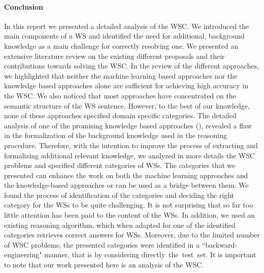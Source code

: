 
\paragraph{Conclusion}
In this report we presented a detailed analysis of the WSC. We introduced the main components of a WS and identified the need for  additional, background knowledge as a main challenge for correctly resolving one. We presented an extensive literature review on the existing different proposals and their contributions towards solving the WSC. In the review of the different approaches, we highlighted that neither the machine learning based approaches nor the knowledge based approaches alone are sufficient for achieving high accuracy in the WSC. We also noticed that most approaches have concentrated on the semantic structure of the WS sentence. However, to the best of our knowledge, none of these approaches specified domain specific categories. The detailed analysis of one of the promising knowledge based approaches (\cite{2018CommonsenseKT}), revealed a flaw in the formalization of the background knowledge used in the reasoning procedure. Therefore, with the intention to improve the process of extracting and formalizing additional relevant knowledge, we analyzed in more details the WSC problems and specified different categories of WSs. The categories that we presented can enhance the work on both the machine learning approaches and the knowledge-based approaches or can be used as a bridge between them. We found the process of identification of the categories and deciding the right category for the WSs to be quite challenging. It is not surprising that so far too little attention has been paid to the content of the WSs. In addition, we used an existing reasoning algorithm, which when adapted for one of the identified categories retrieves correct answers for WSs. 
Moreover, due to the limited number of WSC problems, the presented categories were identified in a ``backward-engineering" manner, that is by considering directly~the~test~set. It is important to note that our work presented here is an analysis of the WSC.


